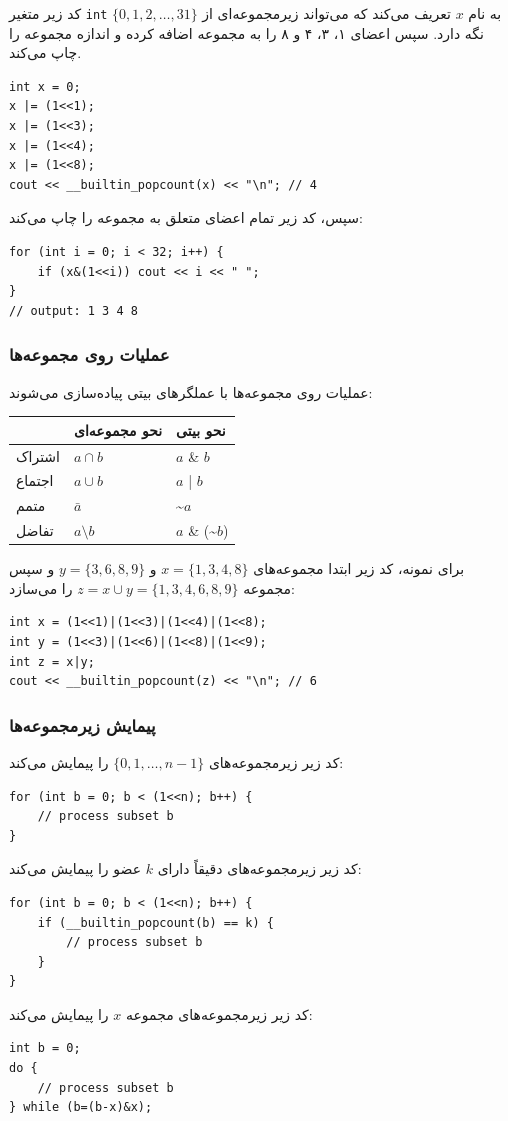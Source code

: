 کد زیر متغیر \texttt{int} به نام $x$ تعریف می‌کند که می‌تواند زیرمجموعه‌ای از $\{0,1,2,\ldots,31\}$ نگه دارد.
سپس اعضای ۱، ۳، ۴ و ۸ را به مجموعه اضافه کرده و اندازه مجموعه را چاپ می‌کند.
\begin{lstlisting}
int x = 0;
x |= (1<<1);
x |= (1<<3);
x |= (1<<4);
x |= (1<<8);
cout << __builtin_popcount(x) << "\n"; // 4
\end{lstlisting}
سپس، کد زیر تمام اعضای متعلق به مجموعه را چاپ می‌کند:
\begin{lstlisting}
for (int i = 0; i < 32; i++) {
    if (x&(1<<i)) cout << i << " ";
}
// output: 1 3 4 8
\end{lstlisting}

\subsubsection{عمليات روی مجموعه‌ها}

عملیات روی مجموعه‌ها با عملگرهای بیتی پیاده‌سازی می‌شوند:

\begin{center}
\begin{tabular}{lll}
& نحو مجموعه‌ای & نحو بیتی \\
\hline
اشتراک & $a \cap b$ & $a$ \& $b$ \\
اجتماع & $a \cup b$ & $a$ | $b$ \\
متمم & $\bar a$ & \textasciitilde$a$ \\
تفاضل & $a \setminus b$ & $a$ \& (\textasciitilde$b$) \\
\end{tabular}
\end{center}

برای نمونه، کد زیر ابتدا مجموعه‌های $x=\{1,3,4,8\}$ و $y=\{3,6,8,9\}$ و سپس مجموعه $z = x \cup y = \{1,3,4,6,8,9\}$ را می‌سازد:

\begin{lstlisting}
int x = (1<<1)|(1<<3)|(1<<4)|(1<<8);
int y = (1<<3)|(1<<6)|(1<<8)|(1<<9);
int z = x|y;
cout << __builtin_popcount(z) << "\n"; // 6
\end{lstlisting}

\subsubsection{پیمایش زیرمجموعه‌ها}

کد زیر زیرمجموعه‌های $\{0,1,\ldots,n-1\}$ را پیمایش می‌کند:

\begin{lstlisting}
for (int b = 0; b < (1<<n); b++) {
    // process subset b
}
\end{lstlisting}
کد زیر زیرمجموعه‌های دقیقاً دارای $k$ عضو را پیمایش می‌کند:
\begin{lstlisting}
for (int b = 0; b < (1<<n); b++) {
    if (__builtin_popcount(b) == k) {
        // process subset b
    }
}
\end{lstlisting}
کد زیر زیرمجموعه‌های مجموعه $x$ را پیمایش می‌کند:
\begin{lstlisting}
int b = 0;
do {
    // process subset b
} while (b=(b-x)&x);
\end{lstlisting}

